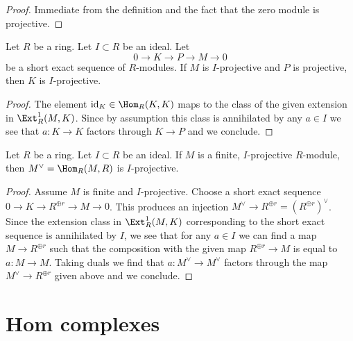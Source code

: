 \begin{proof}
Immediate from the definition and the fact that the zero module is projective.
\end{proof}

\begin{lemma}
\label{lemma-ses-near-projective}
Let $R$ be a ring. Let $I \subset R$ be an ideal. Let
$$
0 \to K \to P \to M \to 0
$$
be a short exact sequence of $R$-modules.
If $M$ is $I$-projective and $P$ is projective, then $K$ is $I$-projective.
\end{lemma}

\begin{proof}
The element $\text{id}_K \in \Hom_R(K, K)$ maps to the class of
the given extension in $\Ext^1_R(M, K)$. Since by assumption this
class is annihilated by any $a \in I$ we see that $a : K \to K$
factors through $K \to P$ and we conclude.
\end{proof}

\begin{lemma}
\label{lemma-dual-near-projective}
Let $R$ be a ring. Let $I \subset R$ be an ideal.
If $M$ is a finite, $I$-projective $R$-module, then
$M^\vee = \Hom_R(M, R)$ is $I$-projective.
\end{lemma}

\begin{proof}
Assume $M$ is finite and $I$-projective.
Choose a short exact sequence $0 \to K \to R^{\oplus r} \to M \to 0$.
This produces an injection $M^\vee \to R^{\oplus r} = (R^{\oplus r})^\vee$.
Since the extension class in $\Ext^1_R(M, K)$ corresponding to
the short exact sequence is annihilated by $I$, we see that
for any $a \in I$ we can find a map $M \to R^{\oplus r}$ such that
the composition with the given map $R^{\oplus r} \to M$ is equal
to $a : M \to M$. Taking duals we find that $a : M^\vee \to M^\vee$
factors through the map $M^\vee \to R^{\oplus r}$ given above and
we conclude.
\end{proof}





\section{Hom complexes}
\label{section-hom-complexes}

